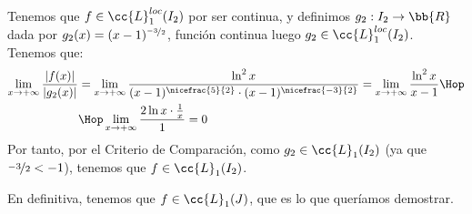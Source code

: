 \begin{ejercicio}
\begin{itemize}
        Tenemos que $f\in \cc{L}_1^{loc}(I_2)$ por ser continua, y definimos $g_2:I_2\to \bb{R}$ dada por $g_2(x)=(x-1)^{\nicefrac{-3}{2}}$, función continua luego $g_2\in \cc{L}_1^{loc}(I_2)$.
        Tenemos que:
        \begin{align*}
            \lim_{x\to +\infty} \dfrac{|f(x)|}{|g_2(x)|}
            &= \lim_{x\to +\infty} \dfrac{\ln^2 x}{(x-1)^{\nicefrac{5}{2}}\cdot (x-1)^{\nicefrac{-3}{2}}}
            = \lim_{x\to +\infty} \dfrac{\ln^2 x}{x-1}
            \Hop\\&\Hop
            \lim_{x\to +\infty} \dfrac{2\ln x\cdot \frac{1}{x}}{1}
            = 0
        \end{align*}
        Por tanto, por el Criterio de Comparación, como $g_2\in \cc{L}_1(I_2)$ (ya que $\nicefrac{-3}{2}<-1$), tenemos que $f\in \cc{L}_1(I_2)$.
    \end{itemize}
    En definitiva, tenemos que $f\in \cc{L}_1(J)$, que es lo que queríamos demostrar.
\end{ejercicio}

